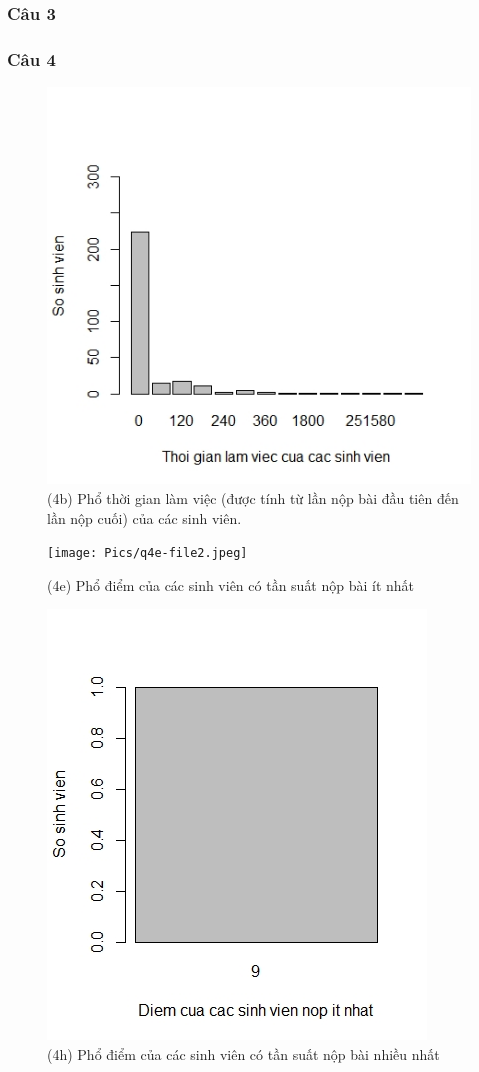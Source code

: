 \documentclass[a4paper]{article}
\theoremstyle{definition}
\begin{document}
\subsubsection{Câu 3}
\subsubsection{Câu 4}
\begin{figure}[!ht]
    \centering
    \includegraphics[scale=0.4]{Pics/q4b-file2.jpeg}
    \caption{(4b) Phổ thời gian làm việc (được tính từ lần nộp bài đầu tiên đến lần nộp cuối) của các
sinh viên.}
    \label{fig:my_label}
\end{figure}
\newpage
\begin{figure}[!ht]
    \centering
    \texttt{[image: Pics/q4e-file2.jpeg]}
    \caption{(4e) Phổ điểm của các sinh viên có tần suất nộp bài ít nhất}
    \label{fig:my_label}
\end{figure}
\begin{figure}[!ht]
    \centering
    \includegraphics[scale=0.4]{Pics/q4h-file2.jpeg}
    \caption{(4h) Phổ điểm của các sinh viên có tần suất nộp bài nhiều nhất}
    \label{fig:my_label}
\end{figure}
\end{document}
